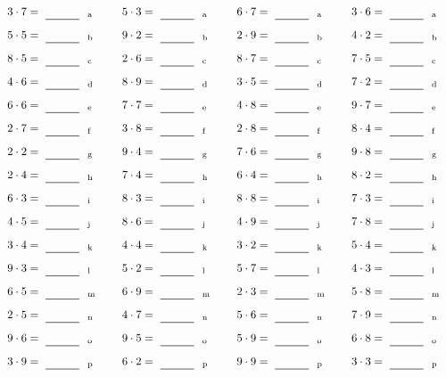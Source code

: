 \documentclass
[
  draft    = true,
  fontsize = 11pt,
  parskip  = half-
]
{scrartcl}
\begin{document}
\par\vfill\par
\begin{align*}
    \pline{3\cdot7}&=\rline{a}
  & \pline{5\cdot3}&=\rline{a}
  & \pline{6\cdot7}&=\rline{a}
  & \pline{3\cdot6}&=\rline{a} \\[1ex]
    \pline{5\cdot5}&=\rline{b}
  & \pline{9\cdot2}&=\rline{b}
  & \pline{2\cdot9}&=\rline{b}
  & \pline{4\cdot2}&=\rline{b} \\[1ex]
    \pline{8\cdot5}&=\rline{c}
  & \pline{2\cdot6}&=\rline{c}
  & \pline{8\cdot7}&=\rline{c}
  & \pline{7\cdot5}&=\rline{c} \\[1ex]
    \pline{4\cdot6}&=\rline{d}
  & \pline{8\cdot9}&=\rline{d}
  & \pline{3\cdot5}&=\rline{d}
  & \pline{7\cdot2}&=\rline{d} \\[1ex]
    \pline{6\cdot6}&=\rline{e}
  & \pline{7\cdot7}&=\rline{e}
  & \pline{4\cdot8}&=\rline{e}
  & \pline{9\cdot7}&=\rline{e} \\[1ex]
    \pline{2\cdot7}&=\rline{f}
  & \pline{3\cdot8}&=\rline{f}
  & \pline{2\cdot8}&=\rline{f}
  & \pline{8\cdot4}&=\rline{f} \\[1ex]
    \pline{2\cdot2}&=\rline{g}
  & \pline{9\cdot4}&=\rline{g}
  & \pline{7\cdot6}&=\rline{g}
  & \pline{9\cdot8}&=\rline{g} \\[1ex]
    \pline{2\cdot4}&=\rline{h}
  & \pline{7\cdot4}&=\rline{h}
  & \pline{6\cdot4}&=\rline{h}
  & \pline{8\cdot2}&=\rline{h} \\[1ex]
    \pline{6\cdot3}&=\rline{i}
  & \pline{8\cdot3}&=\rline{i}
  & \pline{8\cdot8}&=\rline{i}
  & \pline{7\cdot3}&=\rline{i} \\[1ex]
    \pline{4\cdot5}&=\rline{j}
  & \pline{8\cdot6}&=\rline{j}
  & \pline{4\cdot9}&=\rline{j}
  & \pline{7\cdot8}&=\rline{j} \\[1ex]
    \pline{3\cdot4}&=\rline{k}
  & \pline{4\cdot4}&=\rline{k}
  & \pline{3\cdot2}&=\rline{k}
  & \pline{5\cdot4}&=\rline{k} \\[1ex]
    \pline{9\cdot3}&=\rline{l}
  & \pline{5\cdot2}&=\rline{l}
  & \pline{5\cdot7}&=\rline{l}
  & \pline{4\cdot3}&=\rline{l} \\[1ex]
    \pline{6\cdot5}&=\rline{m}
  & \pline{6\cdot9}&=\rline{m}
  & \pline{2\cdot3}&=\rline{m}
  & \pline{5\cdot8}&=\rline{m} \\[1ex]
    \pline{2\cdot5}&=\rline{n}
  & \pline{4\cdot7}&=\rline{n}
  & \pline{5\cdot6}&=\rline{n}
  & \pline{7\cdot9}&=\rline{n} \\[1ex]
    \pline{9\cdot6}&=\rline{o}
  & \pline{9\cdot5}&=\rline{o}
  & \pline{5\cdot9}&=\rline{o}
  & \pline{6\cdot8}&=\rline{o} \\[1ex]
    \pline{3\cdot9}&=\rline{p}
  & \pline{6\cdot2}&=\rline{p}
  & \pline{9\cdot9}&=\rline{p}
  & \pline{3\cdot3}&=\rline{p}
\end{align*}
\end{document}
